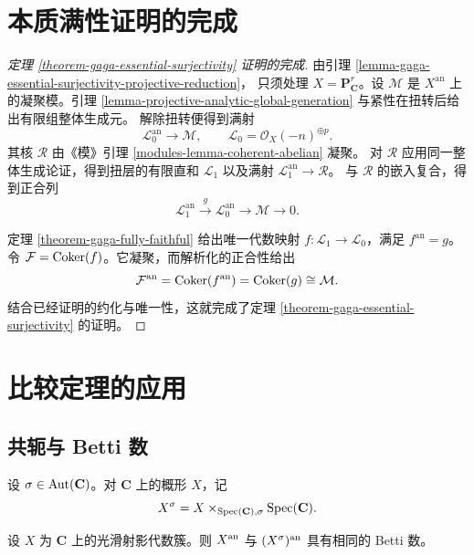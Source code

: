 \section{本质满性证明的完成}
\label{section-completion-gaga-essential-surjectivity}

\begin{proof}[定理 \ref{theorem-gaga-essential-surjectivity} 证明的完成]
由引理 \ref{lemma-gaga-essential-surjectivity-projective-reduction}，
只须处理 $X=\mathbf P^r_{\mathbf C}$。设 $\mathcal M$ 是
$X^{\mathrm{an}}$ 上的凝聚模。引理
\ref{lemma-projective-analytic-global-generation} 与紧性在扭转后给出有限组整体生成元。
解除扭转便得到满射
$$
\mathcal L_0^{\mathrm{an}}\longrightarrow\mathcal M,
\qquad
\mathcal L_0=\mathcal O_X(-n)^{\oplus p}.
$$
其核 $\mathcal R$ 由《模》引理 \ref{modules-lemma-coherent-abelian} 凝聚。
对 $\mathcal R$ 应用同一整体生成论证，得到扭层的有限直和 $\mathcal L_1$
以及满射 $\mathcal L_1^{\mathrm{an}}\to\mathcal R$。
与 $\mathcal R$ 的嵌入复合，得到正合列
$$
\mathcal L_1^{\mathrm{an}}\xrightarrow{g}
\mathcal L_0^{\mathrm{an}}\longrightarrow\mathcal M\longrightarrow0.
$$

定理 \ref{theorem-gaga-fully-faithful} 给出唯一代数映射
$f:\mathcal L_1\to\mathcal L_0$，满足 $f^{\mathrm{an}}=g$。
令 $\mathcal F=\mathop{\rm Coker}(f)$。它凝聚，而解析化的正合性给出
$$
\mathcal F^{\mathrm{an}}
=\mathop{\rm Coker}(f^{\mathrm{an}})
=\mathop{\rm Coker}(g)
\cong\mathcal M.
$$
结合已经证明的约化与唯一性，这就完成了定理
\ref{theorem-gaga-essential-surjectivity} 的证明。
\end{proof}

\section{比较定理的应用}
\label{section-gaga-applications}

\subsection{共轭与 Betti 数}
\label{subsection-gaga-betti-numbers}

设 $\sigma\in\mathop{\rm Aut}(\mathbf C)$。对 $\mathbf C$ 上的概形 $X$，记
$$
X^\sigma=X\times_{\mathop{\rm Spec}(\mathbf C),\sigma}
\mathop{\rm Spec}(\mathbf C).
$$

\begin{proposition}
\label{proposition-conjugate-smooth-projective-betti-numbers}
\begin{reference}
\cite[\S 4，第 18 号，命题 12]{GAGA}
\end{reference}
设 $X$ 为 $\mathbf C$ 上的光滑射影代数簇。则 $X^{\rm an}$ 与
$(X^\sigma)^{\rm an}$ 具有相同的 Betti 数。
\end{proposition}

